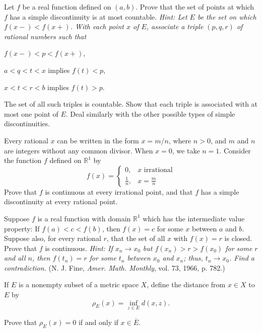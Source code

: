 \begin{exercise}
\item
  Let \(f\) be a real function defined on \((a,b)\).
  Prove that the set of points at which \(f\) has a simple discontinuity is at
  most countable.
  \textit{Hint: Let \(E\) be the set on which \(f(x-) < f(x+)\).
    With each point \(x\) of \(E\), associate a triple \((p,q,r)\) of rational
    numbers such that}
  \begin{exercise}[label = (\alph*)]
  \item
    \(f(x-) < p < f(x+)\),
  \item
    \(a < q < t < x\) implies \(f(t) < p\),
  \item
    \(x < t < r < b\) implies \(f(t) > p\).
  \end{exercise}
  The set of all such triples is countable.
  Show that each triple is associated with at most one point of \(E\).
  Deal similarly with the other possible types of simple discontinuities.
\item
  Every rational \(x\) can be written in the form \(x = m/n\), where \(n > 0\),
  and \(m\) and \(n\) are integers without any common divisor.
  When \(x = 0\), we take \(n = 1\).
  Consider the function \(f\) defined on \(\mathbb{R}^1\) by
  \[
  f(x) =
  \begin{cases}
    0, & x\text{ irrational}\\
    \frac{1}{n}, & x = \frac{m}{n}
  \end{cases}
  \]
  Prove that \(f\) is continuous at every irrational point, and that \(f\) has
  a simple discontinuity at every rational point.
\item
  Suppose \(f\) is a real function with domain \(\mathbb{R}^1\) which has the
  intermediate value property: If \(f(a) < c < f(b)\), then \(f(x) = c\) for
  some \(x\) between \(a\) and \(b\).
  Suppose also, for every rational \(r\), that the set of all \(x\) with
  \(f(x) = r\) is closed.
  Prove that \(f\) is continuous.
  \textit{Hint: If \(x_n\to x_0\) but \(f(x_n) > r > f(x_0)\) for some \(r\)
    and all \(n\), then \(f(t_n) = r\) for some \(t_n\) between \(x_0\) and
    \(x_n\); thus, \(t_n\to x_0\).
    Find a contradiction.}
  (N. J. Fine, \textit{Amer. Math. Monthly}, vol. 73, 1966, p. 782.)
\item
  If \(E\) is a nonempty subset of a metric space \(X\), define the distance
  from \(x\in X\) to \(E\) by
  \[
  \rho_E(x) = \inf_{z\in E} d(x, z).
  \]
  \begin{exercise}[label = (\alph*)]
  \item
    Prove that \(\rho_E(x) = 0\) if and only if \(x\in\bar{E}\).

\end{exercise}
\end{exercise}
